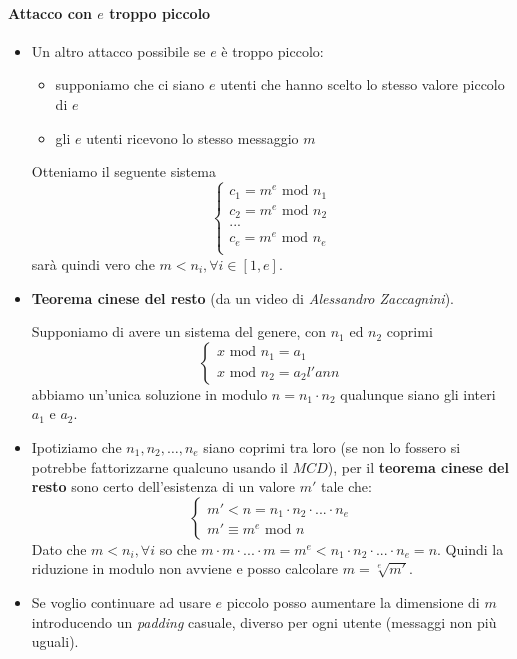 \paragraph{Attacco con $e$ troppo piccolo} 
\begin{itemize}
	\item Un altro attacco possibile se $e$ è troppo piccolo:
	\begin{itemize}
		\item supponiamo che ci siano $e$ utenti che hanno scelto lo stesso valore piccolo di $e$
		\item gli $e$ utenti ricevono lo stesso messaggio $m$
	\end{itemize}
	Otteniamo il seguente sistema
	\[
	\begin{cases}
		c_1 = m^e \text{ mod } n_1 \\
		c_2 = m^e \text{ mod } n_2 \\
		... \\
		c_e = m^e \text{ mod } n_e \\
	\end{cases}
	\]
	sarà quindi vero che $m < n_i, \forall i \in [1,e]$. 
	
	\item \textbf{Teorema cinese del resto} (da un video di \emph{Alessandro Zaccagnini}). 
	
	Supponiamo di avere un sistema del genere, con $n_1$ ed $n_2$ coprimi
	\[\begin{cases}x  \text{ mod } n_1=a_1 \\x \text{ mod } n_2 = a_2l'ann\end{cases}\]
	abbiamo un'unica soluzione in modulo $n=n_1\cdot n_2$ qualunque siano gli interi $a_1$ e $a_2$.
	\item Ipotiziamo che $n_1,n_2,\dots,n_e$ siano coprimi tra loro (se non lo fossero si potrebbe fattorizzarne qualcuno usando il $MCD$), per il \textbf{teorema cinese del resto} sono certo dell'esistenza di un valore $m'$ tale che:
	\[
	\begin{cases}
		m' < n = n_1 \cdot n_2 \cdot ... \cdot n_e \\
		m' \equiv m^e \text{ mod } n
	\end{cases}
	\]
	Dato che $m < n_i, \forall i$ so che $m \cdot m \cdot ... \cdot m = m^e < n_1 \cdot n_2 \cdot ... \cdot n_e = n$.
	Quindi la riduzione in modulo non avviene e posso calcolare $m = \sqrt[e]{m'}$.
	\item Se voglio continuare ad usare $e$ piccolo posso aumentare la dimensione di $m$ introducendo un \textit{padding} casuale, diverso per ogni utente (messaggi non più uguali).
\end{itemize}

